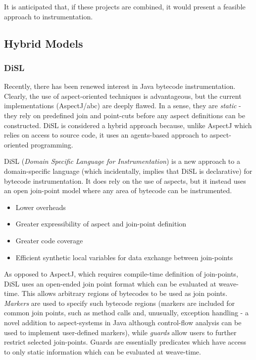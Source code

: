 		It is anticipated that, if these projects are combined, it would present a feasible approach to instrumentation.

	\subsection{Hybrid Models} \label{sec:instrumentation/hybrid}
		\subsubsection{DiSL} \label{sec:instrumentation/hybrid/disl}
		Recently, there has been renewed interest in Java bytecode instrumentation. Clearly, the use of aspect-oriented techniques is advantageous, but the current implementations (AspectJ/abc) are deeply flawed. In a sense, they are \textit{static} - they rely on predefined join and point-cuts before any aspect definitions can be constructed. DiSL is considered a hybrid approach because, unlike AspectJ which relies on access to source code, it uses an agents-based approach to aspect-oriented programming.
		
		DiSL (\textit{Domain Specific Language for Instrumentation}) \citep{Marek2012} is a new approach to a domain-specific language (which incidentally, implies that DiSL is declarative) for bytecode instrumentation. It does rely on the use of aspects, but it instead uses an open join-point model where any area of bytecode can be instrumented.
		
		\begin{itemize}
			\item Lower overheads
			\item Greater expressibility of aspect and join-point definition
			\item Greater code coverage
			\item Efficient synthetic local variables for data exchange between join-points
		\end{itemize}
		
		As opposed to AspectJ, which requires compile-time definition of join-points, DiSL uses an open-ended join point format which can be evaluated at weave-time. This allows arbitrary regions of bytecodes to be used as join points. \textit{Markers} are used to specify such bytecode regions (markers are included for common join points, such as method calls and, unusually, exception handling - a novel addition to aspect-systems in Java although control-flow analysis can be used to implement user-defined markers), while \textit{guards} allow users to further restrict selected join-points. Guards are essentially predicates which have access to only static information which can be evaluated at weave-time.
		
